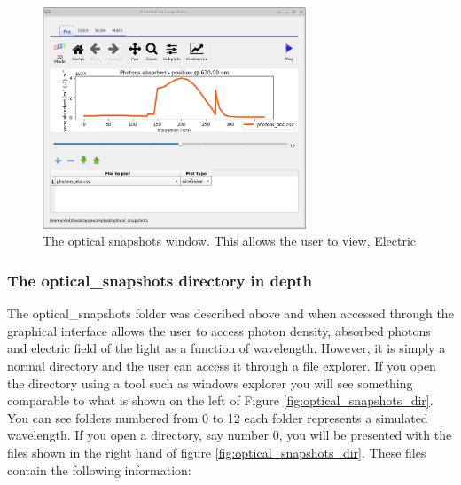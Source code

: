 \begin{figure}[H]
\centering
\includegraphics[height=0.6\textwidth,width=0.7\textwidth]{./images/transfer_matrix/optical_snapshots.png}
\caption{The optical snapshots window. This allows the user to view, Electric }
\label{fig:transfer_matrix_optical_snapshots}
\end{figure}

\subsubsection{The optical\_snapshots directory in depth}
The optical\_snapshots folder was described above and when accessed through the graphical interface allows the user to access photon density, absorbed photons and electric field of the light as a function of wavelength. However, it is simply a normal directory and the user can access it through a file explorer. If you open the directory using a tool such as windows explorer you will see something comparable to what is shown on the left of Figure \ref{fig:optical_snapshots_dir}. You can see folders numbered from 0 to 12 each folder represents a simulated wavelength. If you open a directory, say number 0, you will be presented with the files shown in the right hand of figure \ref{fig:optical_snapshots_dir}. These files contain the following information:

